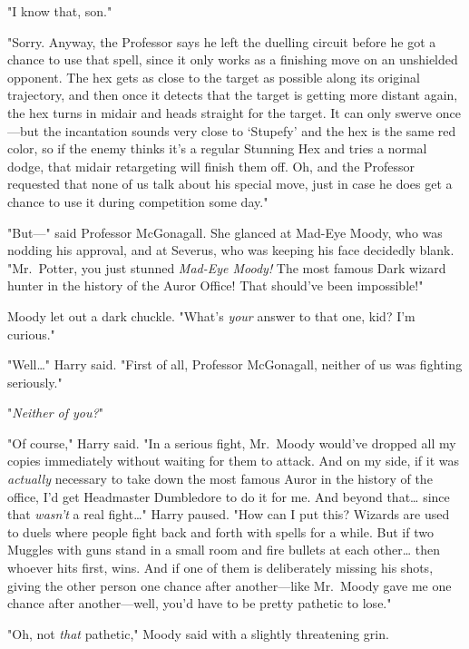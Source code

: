 "I know that, son."

"Sorry. Anyway, the Professor says he left the duelling circuit before he got a
chance to use that spell, since it only works as a finishing move on an
unshielded opponent. The hex gets as close to the target as possible along its
original trajectory, and then once it detects that the target is getting more
distant again, the hex turns in midair and heads straight for the target. It
can only swerve once---but the incantation sounds very close to `Stupefy' and
the hex is the same red color, so if the enemy thinks it's a regular Stunning
Hex and tries a normal dodge, that midair retargeting will finish them off. Oh,
and the Professor requested that none of us talk about his special move, just
in case he does get a chance to use it during competition some day."

"But---" said Professor McGonagall. She glanced at Mad-Eye Moody, who was
nodding his approval, and at Severus, who was keeping his face decidedly blank.
"Mr.~Potter, you just stunned \emph{Mad-Eye Moody!}  The most famous Dark
wizard hunter in the history of the Auror Office! That should've been
impossible!"

Moody let out a dark chuckle. "What's \emph{your} answer to that one, kid? I'm
curious."

"Well{\ldots}" Harry said. "First of all, Professor McGonagall, neither of us
was fighting seriously."

"\emph{Neither of you?}"

"Of course," Harry said. "In a serious fight, Mr.~Moody would've dropped all my
copies immediately without waiting for them to attack. And on my side, if it
was \emph{actually} necessary to take down the most famous Auror in the history
of the office, I'd get Headmaster Dumbledore to do it for me. And beyond
that{\ldots} since that \emph{wasn't} a real fight{\ldots}" Harry paused. "How
can I put this? Wizards are used to duels where people fight back and forth
with spells for a while. But if two Muggles with guns stand in a small room and
fire bullets at each other{\ldots} then whoever hits first, wins. And if one of
them is deliberately missing his shots, giving the other person one chance
after another---like Mr.~Moody gave me one chance after another---well, you'd
have to be pretty pathetic to lose."

"Oh, not \emph{that} pathetic," Moody said with a slightly threatening grin.

